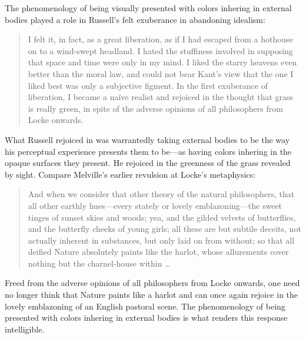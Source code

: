 \documentclass[12pt]{article}
\begin{document}
The phenomenology of being visually presented with colors inhering in external bodies played a role in Russell's felt exuberance in abandoning idealism:
\begin{quote}
	I felt it, in fact, as a great liberation, as if I had escaped from a hothouse on to a wind-swept headland. I hated the stuffiness involved in supposing that space and time were only in my mind. I liked the starry heavens even better than the moral law, and could not bear Kant’s view that the one I liked best was only a subjective figment. In the first exuberance of liberation, I became a naïve realist and rejoiced in the thought that grass is really green, in spite of the adverse opinions of all philosophers from Locke onwards. \citep[48]{Russell:1959fv}
\end{quote}
What Russell rejoiced in was warrantedly taking external bodies to be the way his perceptual experience presents them to be---as having colors inhering in the opaque surfaces they present. He rejoiced in the greenness of the grass revealed by sight. Compare Melville's earlier revulsion at Locke's \citeyearpar{Locke:1706hc} metaphysics:
\begin{quote}
	And when we consider that other theory of the natural philosophers, that all other earthly hues---every stately or lovely emblazoning---the sweet tinges of sunset skies and woods; yea, and the gilded velvets of butterflies, and the butterfly cheeks of young girls; all these are but subtile deceits, not actually inherent in substances, but only laid on from without; so that all deified Nature absolutely paints like the harlot, whose allurements cover nothing but the charnel-house within \ldots\ \citep[ch. 42]{Melville:1851ms}
\end{quote}
Freed from the adverse opinions of all philosophers from Locke onwards, one need no longer think that Nature paints like a harlot and can once again rejoice in the lovely emblazoning of an English pastoral scene. The phenomenology of being presented with colors inhering in external bodies is what renders this response intelligible.
\end{document}
